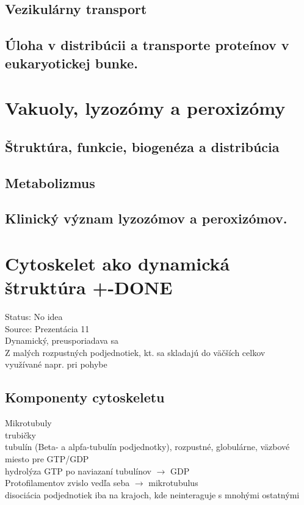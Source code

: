 \subsection{Vezikulárny transport}

\subsection{Úloha v distribúcii a transporte proteínov v eukaryotickej bunke.}

\section{Vakuoly, lyzozómy a peroxizómy}

\subsection{Štruktúra, funkcie, biogenéza a distribúcia}

\subsection{Metabolizmus}

\subsection{Klinický význam lyzozómov a peroxizómov. }

\section{Cytoskelet ako dynamická štruktúra +-DONE}

Status: No idea\\
Source: Prezentácia 11\\

Dynamický, preusporiadava sa\\
Z malých rozpustných podjednotiek, kt. sa skladajú do väčších celkov\\
\tab využívané napr. pri pohybe\\
\subsection{Komponenty cytoskeletu}
Mikrotubuly\\
\tab trubičky\\
\tab tubulín (Beta- a alpfa-tubulín podjednotky), rozpustné, globulárne, väzbové miesto pre GTP/GDP\\
\tab hydrolýza GTP po naviazaní tubulínov $\rightarrow$ GDP\\
 Protofilamentov zvislo vedľa seba $\rightarrow$ mikrotubulus\\
\tab disociácia podjednotiek iba na krajoch, kde neinteraguje s mnohými ostatnými\\

